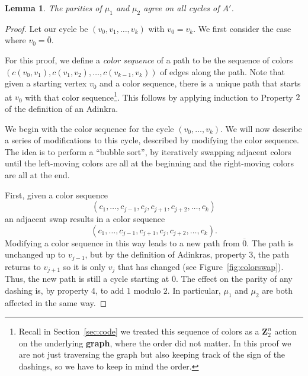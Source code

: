 \documentclass[12pt,twoside,singlespace]{article}
\numberwithin{equation}{section}
\newtheorem{lem}[equation]{Lemma}
\theoremstyle{definition}
\newcommand{\ZZ}{\mathbf{Z}}
\begin{document}
\begin{lem}
\label{lem:switch12}
The parities of $\mu_1$ and $\mu_2$ agree on all cycles of $A'$.
\end{lem}
\begin{proof}
Let our cycle be $(v_0,v_1,\ldots,v_k)$ with $v_0=v_k$.  We first consider the case where $v_0=\overline{0}$.

For this proof, we define a \emph{color sequence} of a path to be the sequence of colors $(c(v_0,v_1),c(v_1,v_2),\ldots,c(v_{k-1},v_k))$ of edges along the path.  Note that given a starting vertex $v_0$ and a color sequence, there is a unique path that starts at $v_0$ with that color sequence\footnote{Recall in Section~\ref{sec:code} we treated this sequence of colors as a $\ZZ_2^n$ action on the underlying \textbf{graph}, where the order did not matter. In this proof we are not just traversing the graph but also keeping track of the sign of the dashings, so we have to keep in mind the order.}.  This follows by applying induction to Property $2$ of the definition of an Adinkra. 

We begin with the color sequence for the cycle $(v_0,\ldots,v_k)$.  We will now describe a series of modifications to this cycle, described by modifying the color sequence.  The idea is to perform a ``bubble sort'', by iteratively swapping adjacent colors until the left-moving colors are all at the beginning and the right-moving colors are all at the end.

First, given a color sequence
\[(c_1,\ldots,c_{j-1},c_j,c_{j+1},c_{j+2},\ldots,c_k)\]
an adjacent swap results in a color sequence
\[(c_1,\ldots,c_{j-1},c_{j+1},c_j,c_{j+2},\ldots,c_k).\]
Modifying a color sequence in this way leads to a new path from $\overline{0}$.  The path is unchanged up to $v_{j-1}$, but by the definition of Adinkras, property 3, the path returns to $v_{j+1}$ so it is only $v_j$ that has changed (see Figure~\ref{fig:colorswap}).  Thus, the new path is still a cycle starting at $\overline{0}$.  The effect on the parity of any dashing is, by property 4, to add $1$ modulo $2$.  In particular, $\mu_1$ and $\mu_2$ are both affected in the same way.


\end{proof}
\end{document}
